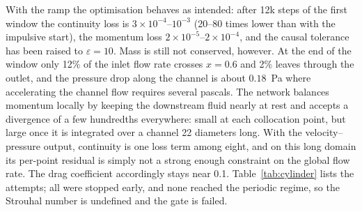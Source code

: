 With the ramp the optimisation behaves as intended: after 12k steps of the first window the continuity loss
is $3\times10^{-4}$--$10^{-3}$ (20--80 times lower than with the impulsive start), the momentum loss
$2\times10^{-5}$--$2\times10^{-4}$, and the causal tolerance has been raised to $\varepsilon=10$. Mass is still not
conserved, however. At the end of the window only 12\% of the inlet flow rate crosses $x=0.6$ and 2\% leaves
through the outlet, and the pressure drop along the channel is about $0.18$~Pa where accelerating the channel flow
requires several pascals. The network balances momentum locally by keeping the downstream fluid nearly at rest
and accepts a divergence of a few hundredths everywhere: small at each collocation point, but large once it
is integrated over a channel 22 diameters long. With the velocity--pressure output, continuity is one loss term
among eight, and on this long domain its per-point residual is simply not a strong enough constraint on the
global flow rate. The drag coefficient accordingly stays near 0.1. Table~\ref{tab:cylinder} lists the attempts;
all were stopped early, and none reached the periodic regime, so the Strouhal number is undefined and the gate
is failed.


